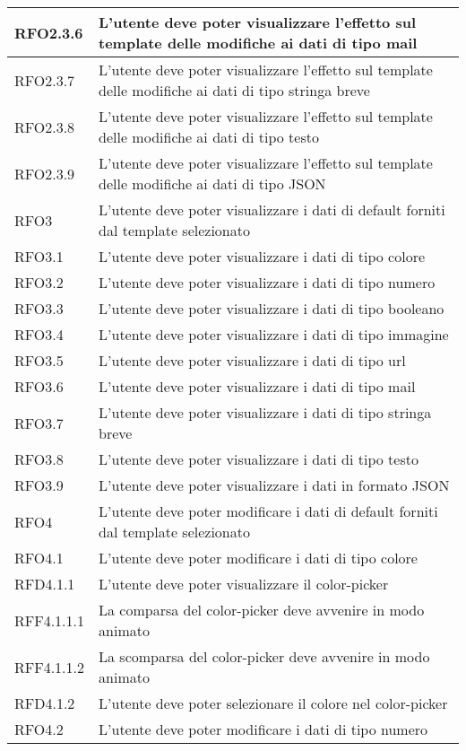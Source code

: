 \begin{longtable}{|l|m{11cm}|}
RFO2.3.6 & L'utente deve poter visualizzare l'effetto sul template delle modifiche ai dati di tipo mail\\ \hline
RFO2.3.7 & L'utente deve poter visualizzare l'effetto sul template delle modifiche ai dati di tipo stringa breve\\ \hline
RFO2.3.8 & L'utente deve poter visualizzare l'effetto sul template delle modifiche ai dati di tipo testo \\ \hline
RFO2.3.9 & L'utente deve poter visualizzare l'effetto sul template delle modifiche ai dati di tipo JSON \\ \hline
RFO3 & L'utente deve poter visualizzare i dati di default forniti dal template selezionato \\ \hline
RFO3.1 & L'utente deve poter visualizzare i dati di tipo colore \\ \hline
RFO3.2 & L'utente deve poter visualizzare i dati di tipo numero \\ \hline
RFO3.3 & L'utente deve poter visualizzare i dati di tipo booleano \\ \hline
RFO3.4 & L'utente deve poter visualizzare i dati di tipo immagine \\ \hline
RFO3.5 & L'utente deve poter visualizzare i dati di tipo url \\ \hline
RFO3.6 & L'utente deve poter visualizzare i dati di tipo mail \\ \hline
RFO3.7 & L'utente deve poter visualizzare i dati di tipo stringa breve \\ \hline
RFO3.8 & L'utente deve poter visualizzare i dati di tipo testo \\ \hline
RFO3.9 & L'utente deve poter visualizzare i dati in formato JSON \\ \hline
RFO4 & L'utente deve poter modificare i dati di default forniti dal template selezionato \\ \hline
RFO4.1 & L'utente deve poter modificare i dati di tipo colore \\ \hline
RFD4.1.1 & L'utente deve poter visualizzare il color-picker \\ \hline
RFF4.1.1.1 & La comparsa del color-picker deve avvenire in modo animato \\ \hline
RFF4.1.1.2 & La scomparsa del color-picker deve avvenire in modo animato \\ \hline
RFD4.1.2 & L'utente deve poter selezionare il colore nel color-picker \\ \hline
RFO4.2 & L'utente deve poter modificare i dati di tipo numero \\ \hline

\end{longtable}
